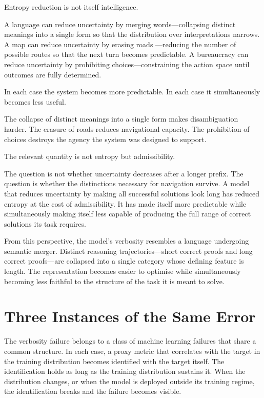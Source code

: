 \documentclass[11pt]{article}
\theoremstyle{rthm}
\theoremstyle{rdef}
\theoremstyle{remark}
\begin{document}
Entropy reduction is not itself intelligence.

A language can reduce uncertainty by merging words---collapsing
distinct meanings into a single form so that the distribution over
interpretations narrows. A map can reduce uncertainty by erasing roads
---reducing the number of possible routes so that the next turn becomes
predictable. A bureaucracy can reduce uncertainty by prohibiting
choices---constraining the action space until outcomes are fully
determined.

In each case the system becomes more predictable. In each case it
simultaneously becomes less useful.

The collapse of distinct meanings into a single form makes
disambiguation harder. The erasure of roads reduces navigational
capacity. The prohibition of choices destroys the agency the system
was designed to support.

The relevant quantity is not entropy but admissibility.

The question is not whether uncertainty decreases after a longer
prefix. The question is whether the distinctions necessary for
navigation survive. A model that reduces uncertainty by making all
successful solutions look long has reduced entropy at the cost of
admissibility. It has made itself more predictable while simultaneously
making itself less capable of producing the full range of correct
solutions its task requires.

From this perspective, the model's verbosity resembles a language
undergoing semantic merger. Distinct reasoning trajectories---short
correct proofs and long correct proofs---are collapsed into a single
category whose defining feature is length. The representation becomes
easier to optimise while simultaneously becoming less faithful to the
structure of the task it is meant to solve.

\section{Three Instances of the Same Error}
\label{sec:instances}

The verbosity failure belongs to a class of machine learning failures
that share a common structure. In each case, a proxy metric that
correlates with the target in the training distribution becomes
identified with the target itself. The identification holds as long
as the training distribution sustains it. When the distribution
changes, or when the model is deployed outside its training regime,
the identification breaks and the failure becomes visible.
\end{document}
